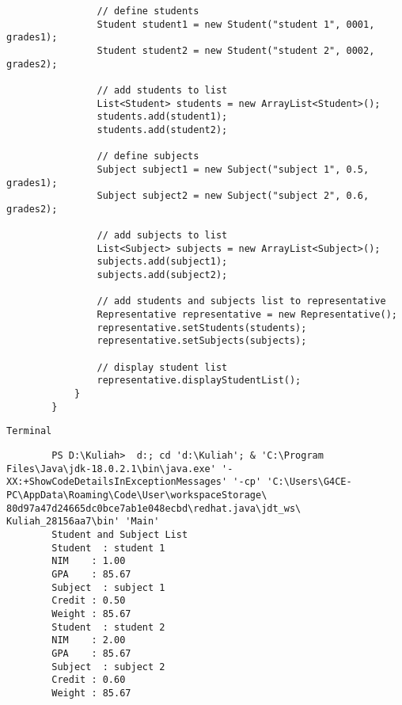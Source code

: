 \documentclass[12pt,titlepage]{article}
\begin{document}
\begin{enumerate}
\begin{verbatim}
                // define students
                Student student1 = new Student("student 1", 0001, grades1);
                Student student2 = new Student("student 2", 0002, grades2);

                // add students to list
                List<Student> students = new ArrayList<Student>();
                students.add(student1);
                students.add(student2);

                // define subjects
                Subject subject1 = new Subject("subject 1", 0.5, grades1);
                Subject subject2 = new Subject("subject 2", 0.6, grades2);

                // add subjects to list
                List<Subject> subjects = new ArrayList<Subject>();
                subjects.add(subject1);
                subjects.add(subject2);

                // add students and subjects list to representative
                Representative representative = new Representative();
                representative.setStudents(students);
                representative.setSubjects(subjects);

                // display student list
                representative.displayStudentList();
            }
        }
    \end{verbatim}
    \texttt{Terminal}
    \begin{verbatim}
        PS D:\Kuliah>  d:; cd 'd:\Kuliah'; & 'C:\Program Files\Java\jdk-18.0.2.1\bin\java.exe' '-XX:+ShowCodeDetailsInExceptionMessages' '-cp' 'C:\Users\G4CE-PC\AppData\Roaming\Code\User\workspaceStorage\ 80d97a47d24665dc0bce7ab1e048ecbd\redhat.java\jdt_ws\ Kuliah_28156aa7\bin' 'Main' 
        Student and Subject List
        Student  : student 1 
        NIM    : 1.00 
        GPA    : 85.67
        Subject  : subject 1
        Credit : 0.50
        Weight : 85.67
        Student  : student 2
        NIM    : 2.00
        GPA    : 85.67
        Subject  : subject 2
        Credit : 0.60
        Weight : 85.67
    \end{verbatim}
\end{enumerate}
\end{document}
